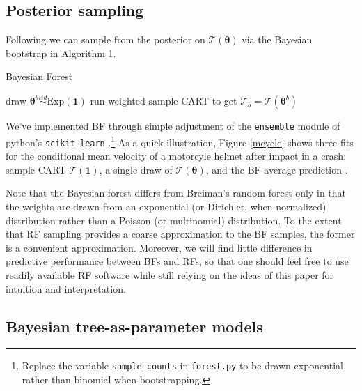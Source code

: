 \documentclass{article}
\begin{document}
\subsection{Posterior sampling}\label{posterior-sampling}



Following \cite{rubin_bayesian_1981} we can  sample from the
posterior on $\mathcal{T}(\boldsymbol{\theta})$ via the 
Bayesian bootstrap in Algorithm 1. 
\begin{algorithm}[ht]
   \caption{Bayesian Forest}
   \label{alg:bf}
\begin{algorithmic}
   \STATE draw $\boldsymbol{\theta}^b \stackrel{iid}{\sim} \mathrm{Exp}(\mathbf{1})$
   \STATE run weighted-sample CART to get $\mathcal{T}_b = \mathcal{T}(\boldsymbol{\theta}^b)$
   \ENDFOR
\end{algorithmic}
\end{algorithm}

   We've implemented  BF through simple adjustment of the
\texttt{ensemble} module of python's \texttt{scikit-learn} \citep{scikit-learn}.\footnote{Replace the variable \texttt{sample\_counts} in \texttt{forest.py}  to be
drawn exponential rather than binomial when bootstrapping.}  As a quick illustration, Figure \ref{mcycle} shows three fits for the conditional mean  velocity of a motorcyle helmet after  impact in a crash: sample CART $\mathcal{T}(\mathbf{1})$, a single draw of $\mathcal{T}(\boldsymbol{\theta})$, and the BF average prediction \citep[data are from the MASS R package,][]{mass}.

Note that the Bayesian forest differs from Breiman's random
forest only in that the weights are drawn from an exponential (or Dirichlet, when normalized) distribution
rather than a Poisson (or multinomial) distribution. To the extent that RF sampling
provides a coarse approximation to the BF samples, the former is a
convenient approximation.  Moreover, we will find little difference in predictive performance between BFs and RFs, so that one should feel free to use readily available RF software while still relying on the ideas of this paper for intuition and interpretation.


    \subsection{Bayesian tree-as-parameter
models}\label{bayesian-tree-as-parameter-models}
\end{document}
